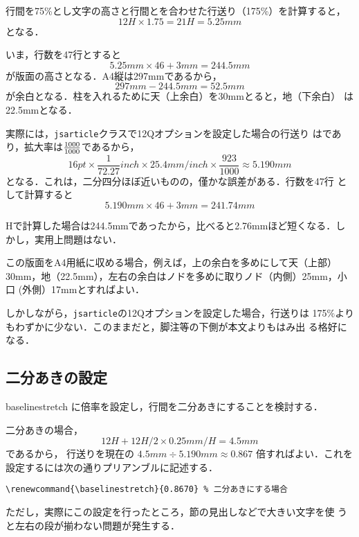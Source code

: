 \documentclass[a4j, 12Q, twocolumn, twoside, draft]{jsarticle}
\newcommand{\cmd}[1]{\texttt{\symbol{"5C}#1}} %
\begin{document}
  行間を75\%とし文字の高さと行間とを合わせた行送り（175\%）を計算すると，
  \[
   12H \times 1.75 = 21H = 5.25 mm
  \]
  となる．

  いま，行数を47行とすると
  \[
   5.25 mm \times 46 + 3mm = 244.5mm
  \]
  が版面の高さとなる．A4縦は297mmであるから，
  \[
   297mm - 244.5mm = 52.5mm
  \]
  が余白となる．柱を入れるために天（上余白）を30mmとると，地（下余白）
  は22.5mmとなる．

  実際には，\texttt{jsarticle}クラスで12Qオプションを設定した場合の行送り
  は\the\baselineskip であり，拡大率は$\frac{\the\mag}{1000}$であるから，
  \[
    16 pt \times \frac{1}{72.27} inch \times 25.4 mm/inch \times
    \frac{923}{1000} \approx 5.190 mm
  \]
  となる．これは，二分四分ほぼ近いものの，僅かな誤差がある．行数を47行
  として計算すると
  \[
   5.190 mm \times 46 + 3mm = 241.74mm
  \]

  Hで計算した場合は244.5mmであったから，比べると2.76mmほど短くなる．し
  かし，実用上問題はない．

この版面をA4用紙に収める場合，例えば，上の余白を多めにして天（上部）
30mm，地（22.5mm），左右の余白はノドを多めに取りノド（内側）25mm，小口
(外側）17mmとすればよい．

しかしながら，\texttt{jsarticle}の12Qオプションを設定した場合，行送りは
175\%よりもわずかに少ない．このままだと，脚注等の下側が本文よりもはみ出
る格好になる．


  
\subsection{二分あきの設定}
  baselinestretch に倍率を設定し，行間を二分あきにすることを検討する．
  
  二分あきの場合，
  \[ 12H + 12H/2 \times 0.25mm/H= 4.5mm\]であるから，
  行送りを現在の
  $4.5mm \div 5.190mm \approx 0.867$
  倍すればよい．これを設定するには次の通りプリアンブルに記述する．

{\small
\begin{verbatim}
\renewcommand{\baselinestretch}{0.8670} % 二分あきにする場合
\end{verbatim}
}

  ただし，実際にこの設定を行ったところ，節の見出しなどで大きい文字を使
  うと左右の段が揃わない問題が発生する．
\end{document}
